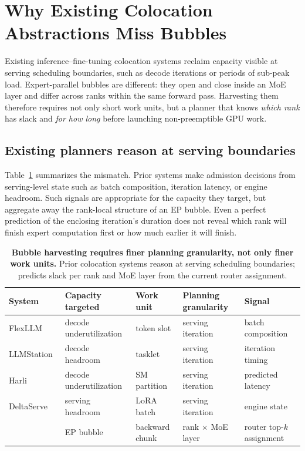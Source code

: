 \section{Why Existing Colocation Abstractions Miss Bubbles}
\label{sec:gap}

\acresetall

Existing inference--fine-tuning colocation systems reclaim capacity
visible at serving scheduling boundaries, such as decode iterations or
periods of sub-peak load. Expert-parallel bubbles are different: they
open and close inside an \ac{MoE} layer and differ across ranks within
the same forward pass. Harvesting them therefore requires not only short
work units, but a planner that knows \emph{which rank} has slack and
\emph{for how long} before launching non-preemptible GPU work.

\subsection{Existing planners reason at serving boundaries}
\label{sec:gap-boundary}

Table~\ref{tab:gap} summarizes the mismatch. Prior systems make admission
decisions from serving-level state such as batch composition, iteration
latency, or engine headroom. Such signals are appropriate for the
capacity they target, but aggregate away the rank-local structure of an
\ac{EP} bubble. Even a perfect prediction of the enclosing iteration's
duration does not reveal which rank will finish expert computation first
or how much earlier it will finish.

\begin{table}[t]
  \centering
  \small
  \caption{
    \textbf{Bubble harvesting requires finer planning granularity, not only
    finer work units.}
    Prior colocation systems reason at serving scheduling boundaries;
    \sys{} predicts slack per rank and \ac{MoE} layer from the current
    router assignment.
  }
  \label{tab:gap}
  \begin{tabular}{lllll}
    \toprule
    System & Capacity targeted & Work unit & Planning granularity & Signal \\
    \midrule
    FlexLLM~\cite{flexllm}
    & decode underutilization
    & token slot
    & serving iteration
    & batch composition \\
    LLMStation~\cite{llmstation}
    & decode headroom
    & tasklet
    & serving iteration
    & iteration timing \\
    Harli~\cite{harli}
    & decode underutilization
    & SM partition
    & serving iteration
    & predicted latency \\
    DeltaServe~\cite{deltaserve}
    & serving headroom
    & LoRA batch
    & serving iteration
    & engine state \\
    \midrule
    \sys{}
    & \ac{EP} bubble
    & backward chunk
    & rank $\times$ \ac{MoE} layer
    & router top-$k$ assignment \\
    \bottomrule
  \end{tabular}
\end{table}

